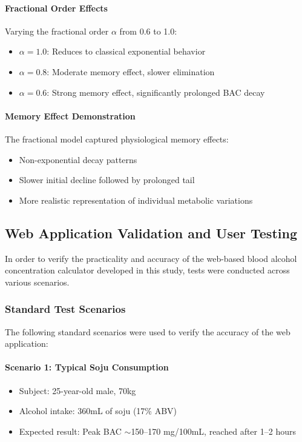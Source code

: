 \documentclass[11pt]{article}
\begin{document}
\paragraph{Fractional Order Effects}
Varying the fractional order $\alpha$ from 0.6 to 1.0:
\begin{itemize}
    \item $\alpha = 1.0$: Reduces to classical exponential behavior
    \item $\alpha = 0.8$: Moderate memory effect, slower elimination
    \item $\alpha = 0.6$: Strong memory effect, significantly prolonged BAC decay
\end{itemize}

\paragraph{Memory Effect Demonstration}
The fractional model captured physiological memory effects:
\begin{itemize}
    \item Non-exponential decay patterns
    \item Slower initial decline followed by prolonged tail
    \item More realistic representation of individual metabolic variations
\end{itemize}

\subsection{Web Application Validation and User Testing}

In order to verify the practicality and accuracy of the web-based blood alcohol concentration calculator developed in this study, tests were conducted across various scenarios.

\subsubsection{Standard Test Scenarios}

The following standard scenarios were used to verify the accuracy of the web application:

\paragraph{Scenario 1: Typical Soju Consumption}
\begin{itemize}
    \item Subject: 25-year-old male, 70kg
    \item Alcohol intake: 360mL of soju (17\% ABV)
    \item Expected result: Peak BAC $\sim$150–170 mg/100mL, reached after 1–2 hours
\end{itemize}
\end{document}
